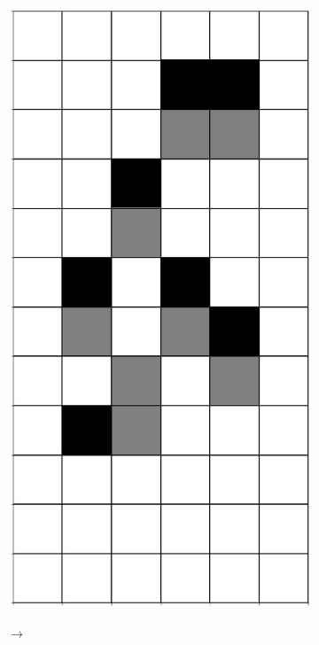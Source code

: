 \documentclass[12pt]{article}
\numberwithin{figure}{section} %
\begin{document}
\begin{figure}[H]
        \begin{subfigure}{0.3\textwidth}
     		\centering
     		\includegraphics[angle=270,width=\linewidth]{Section4/5.2}
     		\subcaption{}
   	\end{subfigure}
	\begin{subfigure}[t]{0.03\textwidth}
      		{\LARGE$\xrightarrow{}$}
	\end{subfigure}
      	\newline
   	\setcounter{subfigure}{0}


\end{figure}
\end{document}

